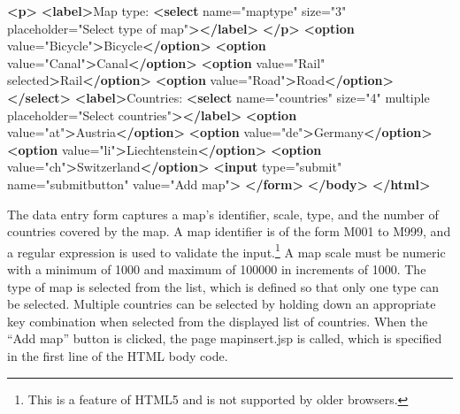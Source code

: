 \documentclass[
]{article}
\newenvironment{Shaded}{\begin{snugshade}}{\end{snugshade}}
\newcommand{\KeywordTok}[1]{\textcolor[rgb]{0.13,0.29,0.53}{\textbf{#1}}}
\newcommand{\NormalTok}[1]{#1}
\newcommand{\OtherTok}[1]{\textcolor[rgb]{0.56,0.35,0.01}{#1}}
\newcommand{\StringTok}[1]{\textcolor[rgb]{0.31,0.60,0.02}{#1}}
\begin{document}
\begin{Shaded}
\begin{Highlighting}[]
    \KeywordTok{\textless{}p\textgreater{}}
        \KeywordTok{\textless{}label\textgreater{}}\NormalTok{Map type: }\KeywordTok{\textless{}select}\OtherTok{ name=}\StringTok{"maptype"}\OtherTok{ size=}\StringTok{"3"}
\OtherTok{            placeholder=}\StringTok{"Select type of map"}\KeywordTok{\textgreater{}\textless{}/label\textgreater{}}
    \KeywordTok{\textless{}/p\textgreater{}}
    \KeywordTok{\textless{}option}\OtherTok{ value=}\StringTok{"Bicycle"}\KeywordTok{\textgreater{}}\NormalTok{Bicycle}\KeywordTok{\textless{}/option\textgreater{}}
    \KeywordTok{\textless{}option}\OtherTok{ value=}\StringTok{"Canal"}\KeywordTok{\textgreater{}}\NormalTok{Canal}\KeywordTok{\textless{}/option\textgreater{}}
    \KeywordTok{\textless{}option}\OtherTok{ value=}\StringTok{"Rail"}\OtherTok{ selected}\KeywordTok{\textgreater{}}\NormalTok{Rail}\KeywordTok{\textless{}/option\textgreater{}}
    \KeywordTok{\textless{}option}\OtherTok{ value=}\StringTok{"Road"}\KeywordTok{\textgreater{}}\NormalTok{Road}\KeywordTok{\textless{}/option\textgreater{}}
    \KeywordTok{\textless{}/select\textgreater{}} \KeywordTok{\textless{}label\textgreater{}}\NormalTok{Countries: }\KeywordTok{\textless{}select}\OtherTok{ name=}\StringTok{"countries"}\OtherTok{ size=}\StringTok{"4"}\OtherTok{ multiple}
\OtherTok{        placeholder=}\StringTok{"Select countries"}\KeywordTok{\textgreater{}\textless{}/label\textgreater{}}
    \KeywordTok{\textless{}option}\OtherTok{ value=}\StringTok{"at"}\KeywordTok{\textgreater{}}\NormalTok{Austria}\KeywordTok{\textless{}/option\textgreater{}}
    \KeywordTok{\textless{}option}\OtherTok{ value=}\StringTok{"de"}\KeywordTok{\textgreater{}}\NormalTok{Germany}\KeywordTok{\textless{}/option\textgreater{}}
    \KeywordTok{\textless{}option}\OtherTok{ value=}\StringTok{"li"}\KeywordTok{\textgreater{}}\NormalTok{Liechtenstein}\KeywordTok{\textless{}/option\textgreater{}}
    \KeywordTok{\textless{}option}\OtherTok{ value=}\StringTok{"ch"}\KeywordTok{\textgreater{}}\NormalTok{Switzerland}\KeywordTok{\textless{}/option\textgreater{}}
    \KeywordTok{\textless{}input}\OtherTok{ type=}\StringTok{"submit"}\OtherTok{ name=}\StringTok{"submitbutton"}\OtherTok{ value=}\StringTok{"Add map"}\KeywordTok{\textgreater{}}
\KeywordTok{\textless{}/form\textgreater{}}
\KeywordTok{\textless{}/body\textgreater{}}
\KeywordTok{\textless{}/html\textgreater{}}
\end{Highlighting}
\end{Shaded}

The data entry form captures a map's identifier, scale, type, and the
number of countries covered by the map. A map identifier is of the form
M001 to M999, and a regular expression is used to validate the
input.\footnote{This is a feature of HTML5 and is not supported by older browsers.} A map scale must be numeric with a minimum of 1000 and
maximum of 100000 in increments of 1000. The type of map is selected
from the list, which is defined so that only one type can be selected.
Multiple countries can be selected by holding down an appropriate key
combination when selected from the displayed list of countries. When the
``Add map'' button is clicked, the page mapinsert.jsp is called, which is
specified in the first line of the HTML body code.
\end{document}
